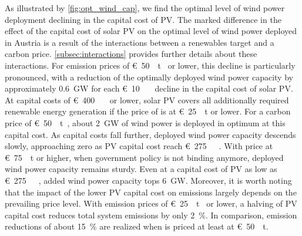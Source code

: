 \documentclass[review, 3p, times, 12pt, authoryear]{elsarticle}
\begin{document}
    As illustrated by \autoref{fig:opt_wind_cap}, we find the optimal level of wind power deployment declining in the capital cost of PV.
    The marked difference in the effect of the capital cost of solar PV on the optimal level of wind power deployed in Austria is a result of the interactions between a renewables target and a carbon price.
    \ref{subsec:interactions} provides further details about these interactions.
    For emission prices of \SI[per-mode=symbol,sticky-per, bracket-unit-denominator=false]{50}[\euro]{\per\tonne\coo} or lower, this decline is particularly pronounced, with a reduction of the optimally deployed wind power capacity by approximately \SI{0.6}{\giga\watt} for each \SI[per-mode=symbol,sticky-per, bracket-unit-denominator=false]{10}[\euro]{\per\kilo\wattpeak} decline in the capital cost of solar PV.
    At capital costs of \SI[per-mode=symbol,sticky-per, bracket-unit-denominator=false]{400}[\euro]{\per\kilo\wattpeak} or lower, solar PV covers all additionally required renewable energy generation if the price of  is at \SI[per-mode=symbol,sticky-per, bracket-unit-denominator=false]{25}[\euro]{\per\tonne} or lower.
    For a carbon price of \SI[per-mode=symbol,sticky-per, bracket-unit-denominator=false]{50}[\euro]{\per\tonne\coo}, about \SI{2}{\giga\watt} of wind power is deployed in optimum at this capital cost.
    As capital costs fall further, deployed wind power capacity descends slowly, approaching zero as PV capital cost reach \SI[per-mode=symbol,sticky-per, bracket-unit-denominator=false]{275}[\euro]{\per\kilo\wattpeak}.
    With  price at \SI[per-mode=symbol,sticky-per, bracket-unit-denominator=false]{75}[\euro]{\per\tonne} or higher, when government policy is not binding anymore, deployed wind power capacity remains sturdy.
    Even at a capital cost of PV as low as \SI[per-mode=symbol,sticky-per, bracket-unit-denominator=false]{275}[\euro]{\per\kilo\wattpeak}, added wind power capacity tops \SI{6}{\giga\watt}.
    Moreover, it is worth noting that the impact of the lower PV capital cost on  emissions largely depends on the prevailing  price level.
    With emission prices of \SI[per-mode=symbol,sticky-per, bracket-unit-denominator=false]{25}[\euro]{\per\tonne\coo} or lower, a halving of PV capital cost reduces total system emissions by only \SI{2}{\percent}.
    In comparison, emission reductions of about \SI{15}{\percent} are realized when  is priced at least at \SI[per-mode=symbol,sticky-per, bracket-unit-denominator=false]{50}[\euro]{\per\tonne}.
\end{document}
